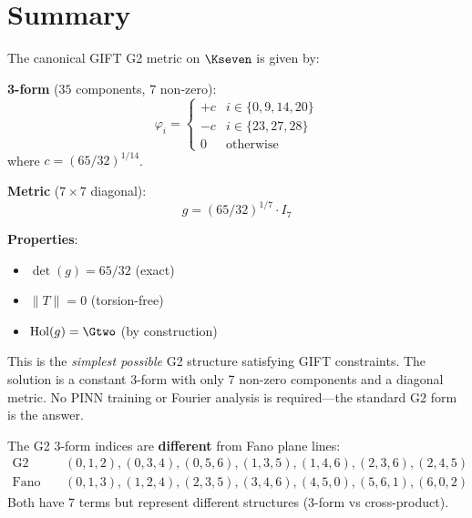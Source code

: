 \section{Summary}

\begin{theorem}\label{thm:analytical_metric}
    \leanok
    The canonical GIFT G2 metric on $\Kseven$ is given by:

    \textbf{3-form} ($35$ components, $7$ non-zero):
    \[
        \varphi_i = \begin{cases}
            +c & i \in \{0, 9, 14, 20\} \\
            -c & i \in \{23, 27, 28\} \\
            0 & \text{otherwise}
        \end{cases}
    \]
    where $c = (65/32)^{1/14}$.

    \textbf{Metric} ($7 \times 7$ diagonal):
    \[
        g = (65/32)^{1/7} \cdot I_7
    \]

    \textbf{Properties}:
    \begin{itemize}
        \item $\det(g) = 65/32$ (exact)
        \item $\|T\| = 0$ (torsion-free)
        \item $\mathrm{Hol}(g) = \Gtwo$ (by construction)
    \end{itemize}
\end{theorem}

\begin{remark}[Simplicity]
    This is the \emph{simplest possible} G2 structure satisfying GIFT constraints.
    The solution is a constant 3-form with only 7 non-zero components and a
    diagonal metric. No PINN training or Fourier analysis is required---the
    standard G2 form is the answer.
\end{remark}

\begin{remark}[G2 vs Fano]
    The G2 3-form indices are \textbf{different} from Fano plane lines:
    \begin{align*}
        \text{G2 3-form:} &\quad (0,1,2), (0,3,4), (0,5,6), (1,3,5), (1,4,6), (2,3,6), (2,4,5) \\
        \text{Fano lines:} &\quad (0,1,3), (1,2,4), (2,3,5), (3,4,6), (4,5,0), (5,6,1), (6,0,2)
    \end{align*}
    Both have 7 terms but represent different structures (3-form vs cross-product).
\end{remark}

